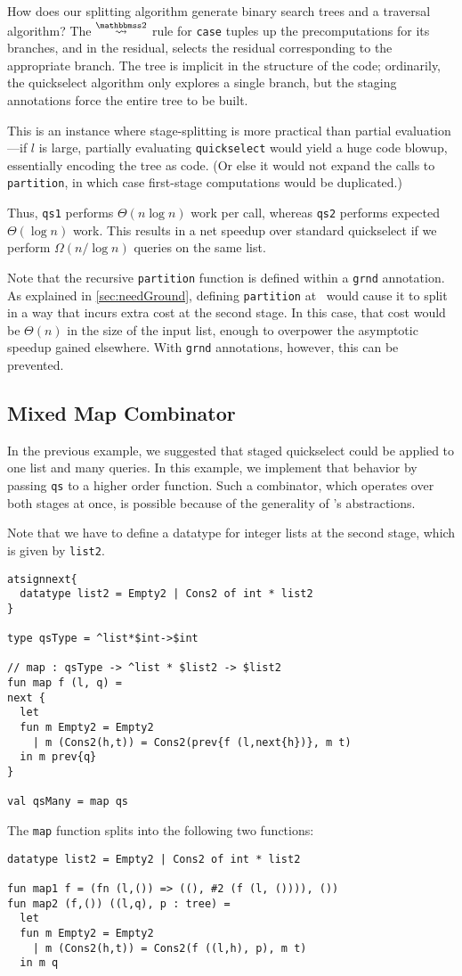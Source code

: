 How does our splitting algorithm generate binary search trees and a traversal
algorithm? The $\splittwosym$ rule for \texttt{case} tuples up the
precomputations for its branches, and in the residual, selects the residual
corresponding to the appropriate branch. The tree is implicit in the structure
of the code; ordinarily, the quickselect algorithm only explores a single
branch, but the staging annotations force the entire tree to be built.

This is an instance where stage-splitting is more practical than partial
evaluation---if $l$ is large, partially evaluating \texttt{quickselect} would
yield a huge code blowup, essentially encoding the tree as code. (Or else it
would not expand the calls to \texttt{partition}, in which case first-stage
computations would be duplicated.)

Thus, \texttt{qs1} performs $\Theta(n \log n)$ work per call, whereas
\texttt{qs2} performs expected $\Theta(\log n)$ work.  This results in a net
speedup over standard quickselect if we perform $\Omega(n / \log n)$ queries on
the same list. 

Note that the recursive \texttt{partition} function is defined within a \texttt{grnd}
annotation.  As explained in \ref{sec:needGround}, defining \texttt{partition}
at \bbonem\ would cause it to split in a way that incurs extra cost at the second stage.
In this case, that cost would be $\Theta(n)$ in the size of the input list,
enough to overpower the asymptotic speedup gained elsewhere.
With \texttt{grnd} annotations, however, this can be prevented.

\subsection {Mixed Map Combinator}

In the previous example, we suggested that staged quickselect could be applied to one list and many queries.
In this example, we implement that behavior by passing \texttt{qs} to a higher order function.
Such a combinator, which operates over both stages at once, is possible because of the generality of \lang's abstractions.

Note that we have to define a datatype for integer lists at the second stage, which is given by \texttt{list2}.
\begin{lstlisting} 
atsignnext{
  datatype list2 = Empty2 | Cons2 of int * list2
}

type qsType = ^list*$int->$int

// map : qsType -> ^list * $list2 -> $list2
fun map f (l, q) = 
next {
  let 
  fun m Empty2 = Empty2
    | m (Cons2(h,t)) = Cons2(prev{f (l,next{h})}, m t)
  in m prev{q}
}

val qsMany = map qs
\end{lstlisting}
The \texttt{map} function splits into the following two functions:
\begin{lstlisting} 
datatype list2 = Empty2 | Cons2 of int * list2

fun map1 f = (fn (l,()) => ((), #2 (f (l, ()))), ())
fun map2 (f,()) ((l,q), p : tree) =
  let 
  fun m Empty2 = Empty2
    | m (Cons2(h,t)) = Cons2(f ((l,h), p), m t) 
  in m q
\end{lstlisting}

